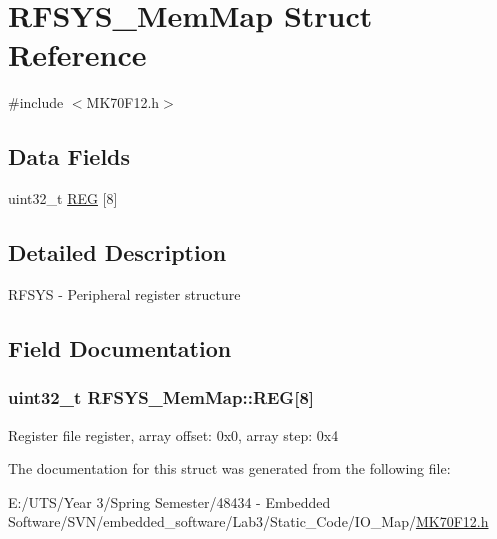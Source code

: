 \hypertarget{struct_r_f_s_y_s___mem_map}{}\section{R\+F\+S\+Y\+S\+\_\+\+Mem\+Map Struct Reference}
\label{struct_r_f_s_y_s___mem_map}


{\ttfamily \#include $<$M\+K70\+F12.\+h$>$}

\subsection*{Data Fields}
\begin{DoxyCompactItemize}
\item 
uint32\+\_\+t \hyperlink{struct_r_f_s_y_s___mem_map_a9ecc7686e575e2e1570cf50aa3234276}{R\+E\+G} \mbox{[}8\mbox{]}
\end{DoxyCompactItemize}


\subsection{Detailed Description}
R\+F\+S\+Y\+S -\/ Peripheral register structure 

\subsection{Field Documentation}
\hypertarget{struct_r_f_s_y_s___mem_map_a9ecc7686e575e2e1570cf50aa3234276}{}
\subsubsection[{R\+E\+G}]{\setlength{\rightskip}{0pt plus 5cm}uint32\+\_\+t R\+F\+S\+Y\+S\+\_\+\+Mem\+Map\+::\+R\+E\+G\mbox{[}8\mbox{]}}\label{struct_r_f_s_y_s___mem_map_a9ecc7686e575e2e1570cf50aa3234276}
Register file register, array offset\+: 0x0, array step\+: 0x4 

The documentation for this struct was generated from the following file\+:\begin{DoxyCompactItemize}
\item 
E\+:/\+U\+T\+S/\+Year 3/\+Spring Semester/48434 -\/ Embedded Software/\+S\+V\+N/embedded\+\_\+software/\+Lab3/\+Static\+\_\+\+Code/\+I\+O\+\_\+\+Map/\hyperlink{_m_k70_f12_8h}{M\+K70\+F12.\+h}\end{DoxyCompactItemize}
